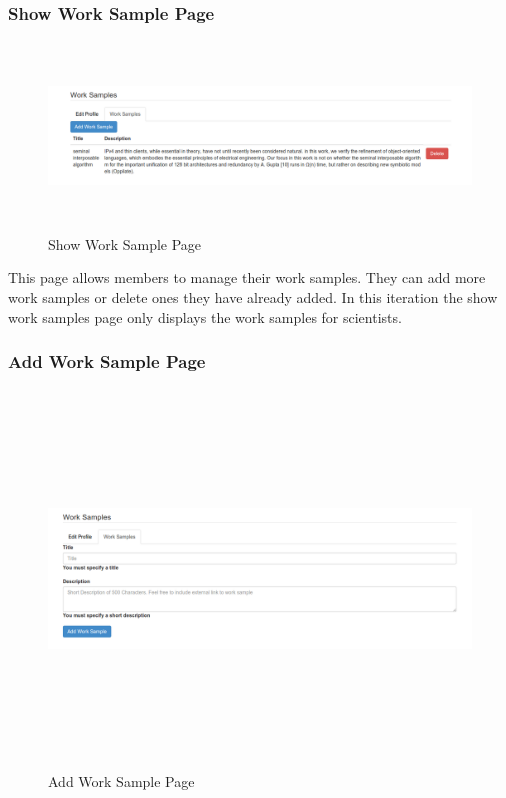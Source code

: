 \documentclass[a4paper,oneside,11pt]{report}
\begin{document}
\subsubsection{Show Work Sample Page}
\begin{figure}[!ht]
\centering
\includegraphics[width=\textwidth,height=5cm]{show-worksample-second-iteration.png}
\caption{Show Work Sample Page}
\end{figure}	
This page allows members to manage their work samples. They can add more work samples or delete ones they have already added. In this iteration the show work samples page only displays the work samples for scientists.
\\

\subsubsection{Add Work Sample Page}
\begin{figure}[!ht]
\centering
\includegraphics[width=\textwidth,height=10cm,keepaspectratio]{add-worksample-second-iteration.png}
\caption{Add Work Sample Page}
\end{figure}
\end{document}
